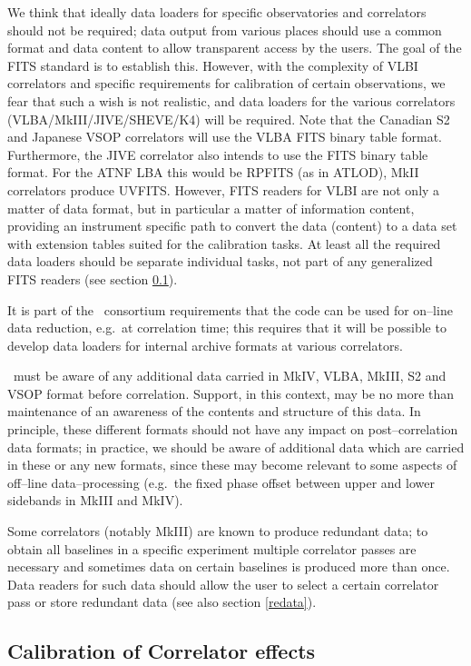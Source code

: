We think that ideally data loaders for specific observatories and
correlators should not be required; data output from various places
should use a common format and data content to allow transparent
access by the users. The goal of the FITS standard is to establish
this. However, with the complexity of VLBI correlators and specific
requirements for calibration of certain observations, we fear that
such a wish is not realistic, and data loaders for the various
correlators (VLBA\slash MkIII\slash JIVE\slash SHEVE\slash K4) will be
required. Note that the Canadian S2 and Japanese VSOP correlators will
use the VLBA FITS binary table format. Furthermore, the JIVE
correlator also intends to use the FITS binary table format. For the
ATNF LBA this would be RPFITS (as in ATLOD), MkII correlators produce
UVFITS. However, FITS readers for VLBI are not only a matter of data
format, but in particular a matter of information content, providing
an instrument specific path to convert the data (content) to a data
set with extension tables suited for the calibration tasks. At least
all the required data loaders should be separate individual tasks, not
part of any generalized FITS readers (see section \ref{corerr}).  

It is part of the \aipspp\ consortium requirements that the code can
be used for on--line data reduction, e.g.\ at correlation time; this
requires that it will be possible to develop data loaders for internal
archive formats at various correlators. 

\aipspp\ must be aware of any additional data carried in MkIV, VLBA,
MkIII, S2 and VSOP format before correlation. Support, in this
context, may be no more than maintenance of an awareness of the
contents and structure of this data. In principle, these different
formats should not have any impact on post--correlation data formats;
in practice, we should be aware of additional data which are carried
in these or any new formats, since these may become relevant to some
aspects of off--line data--processing (e.g.\ the fixed phase offset
between upper and lower sidebands in MkIII and MkIV).

Some correlators (notably MkIII) are known to produce redundant data;
to obtain all baselines in a specific experiment multiple correlator
passes are necessary and sometimes data on certain baselines is
produced more than once. Data readers for such data should allow the
user to select a certain correlator pass or store redundant data
(see also section \ref{redata}). 

\subsection{Calibration of Correlator effects}
\label{corerr}

